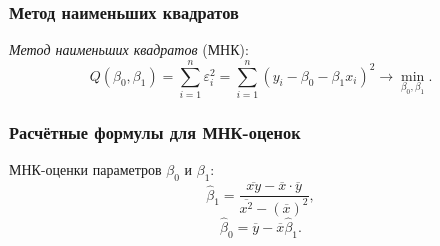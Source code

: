\documentclass[a4paper]{article}
\begin{document}
\subsubsection{Метод наименьших квадратов}
\textit{Метод наименьших квадратов} (МНК):
\begin{equation}
    Q\left(\beta_0,\beta_1\right)=\sum_{i=1}^n \varepsilon_i^2= \sum_{i=1}^n\left(y_i-\beta_0-\beta_1 x_i\right)^2\to\min_{\beta_0,\beta_1}.
\end{equation}
\subsubsection{Расчётные формулы для МНК-оценок}
МНК-оценки параметров $\beta_0$ и $\beta_1$:
\begin{equation}
    \widehat{\beta}_1=\frac{\overline{xy}-\overline{x}\cdot\overline{y}}{\overline{x^2}-(\overline{x})^2},
\end{equation}
\begin{equation}
    \widehat{\beta}_0=\overline{y}-\overline{x}\widehat{\beta}_1.
\end{equation}
\end{document}
